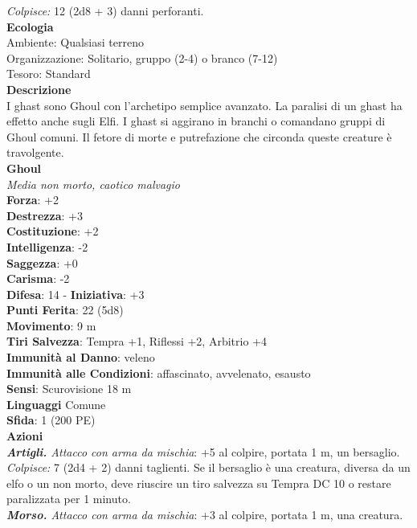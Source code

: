 \begin{multicols}{2}
\emph{Colpisce:} 12 (2d8 + 3) danni perforanti.\\
\textbf{Ecologia}\\
Ambiente: Qualsiasi terreno\\
Organizzazione: Solitario, gruppo (2-4) o branco (7-12)\\
Tesoro: Standard\\
\textbf{Descrizione}\\
I ghast sono Ghoul con l'archetipo semplice avanzato. La paralisi di un ghast ha effetto anche sugli Elfi. I ghast si aggirano in branchi o comandano gruppi di Ghoul comuni. Il fetore di morte e putrefazione che circonda queste creature è travolgente.\\


\medskip\textbf{Ghoul}\\
\emph{Media non morto, caotico malvagio}\\
\textbf{Forza}: +2\\
\textbf{Destrezza}: +3\\
\textbf{Costituzione}: +2\\
\textbf{Intelligenza}: -2\\
\textbf{Saggezza}: +0\\
\textbf{Carisma}: -2\\
\textbf{Difesa}: 14 - \textbf{Iniziativa}: +3\\
\textbf{Punti Ferita}: 22 (5d8)\\
\textbf{Movimento}: 9 m\\
\textbf{Tiri Salvezza}: Tempra +1, Riflessi +2, Arbitrio +4\\
\textbf{Immunità al Danno}: veleno\\
\textbf{Immunità alle Condizioni}: affascinato, avvelenato, esausto\\
\textbf{Sensi}: Scurovisione 18 m\\
\textbf{Linguaggi} Comune\\
\textbf{Sfida}: 1 (200 PE)\smallskip\\
\smallskip\textbf{Azioni}\\
\emph{\textbf{Artigli.} Attacco con arma da mischia}: +5 al colpire, portata 1 m, un bersaglio.\\
\emph{Colpisce:} 7 (2d4 + 2) danni taglienti. Se il bersaglio è una creatura, diversa da un elfo o un non morto, deve riuscire un tiro salvezza su Tempra DC 10 o restare paralizzata per 1 minuto.\\
\emph{\textbf{Morso.} Attacco con arma da mischia}: +3 al colpire, portata 1 m, una creatura.\\

\end{multicols}

